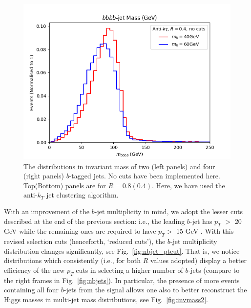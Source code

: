 \documentclass[12pt]{article}
\begin{document}
\begin{figure}[t!]
	\includegraphics[scale=0.5]{plots/bbbbmass_AK4_nocuts.png}
	\caption{The distributions in invariant mass of two (left panels) and four (right panels) $b$-tagged jets. No cuts have been implemented here.
Top(Bottom) panels are for $R = 0.8(0.4)$. Here, we have used the anti-$k_T$ jet clustering algorithm.}
\label{fig:invmass1}
\end{figure}
%



{{With an improvement of the $b$-jet multiplicity in mind, we adopt the lesser cuts described at the end of the previous section:}} i.e., the
leading $b$-jet has $p_T$ $>$ 20 GeV while the remaining ones are required to  have $p_T >$ 15 GeV \cite{Sirunyan:2018mot}. With this
revised selection cuts (henceforth, `reduced cuts'), the $b$-jet multiplicity distribution changes significantly, see Fig.~\ref{fig:nbjet_ptcut}. That is, we notice distributions which consistently (i.e., for both $R$ values adopted) display a better efficiency  of the new $p_T$ cuts  in selecting a higher number of $b$-jets
 (compare to the right frames in Fig.~\ref{fig:nbjets}).  In particular, the presence of more events containing all four $b$-jets from the signal
allows one also to better reconstruct the Higgs masses in multi-jet mass distributions, see Fig.~\ref{fig:invmass2}.
\end{document}
